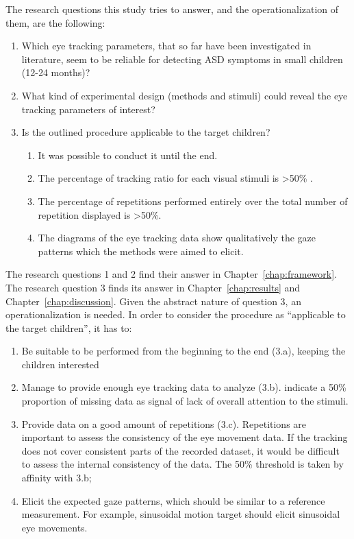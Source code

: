 The research questions this study tries to answer, and the operationalization of them, are the following:
\begin{enumerate}
    \item Which eye tracking parameters, that so far have been investigated in literature, seem to be reliable for detecting ASD symptoms in small children (12-24 months)?
    \item What kind of experimental design (methods and stimuli) could reveal the eye tracking parameters of interest?
    \item Is the outlined procedure applicable to the target children?
    \begin{enumerate}[label*=\alph*.]
        \item It was possible to conduct it until the end.
        \item The percentage of tracking ratio for each visual stimuli is >50\% \citep{sasson2012children}.
        \item The percentage of repetitions performed entirely over the total number of repetition displayed is >50\%.
        \item The diagrams of the eye tracking data show qualitatively the gaze patterns which the methods were aimed to elicit.
    \end{enumerate}
\end{enumerate}

The research questions 1 and 2 find their answer in Chapter~\ref{chap:framework}. The research question 3 finds its answer in Chapter~\ref{chap:results} and Chapter~\ref{chap:discussion}. Given the abstract nature of question 3, an operationalization is needed. In order to consider the procedure as “applicable to the target children”, it has to:
\begin{enumerate}
    \item Be suitable to be performed from the beginning to the end (3.a), keeping the children interested
    \item Manage to provide enough eye tracking data to analyze (3.b). \cite{sasson2012children} indicate a 50\% proportion of missing data as signal of lack of overall attention to the stimuli.
    \item Provide data on a good amount of repetitions (3.c). Repetitions are important to assess the consistency of the eye movement data. If the tracking does not cover consistent parts of the recorded dataset, it would be difficult to assess the internal consistency of the data. The 50\% threshold is taken by affinity with 3.b;
    \item Elicit the expected gaze patterns, which should be similar to a reference measurement. For example, sinusoidal motion target should elicit sinusoidal eye movements.
\end{enumerate}


